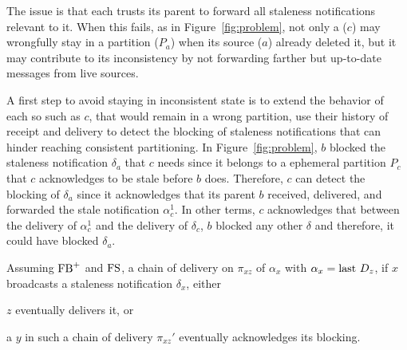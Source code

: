 The issue is that each \process trusts its parent to forward all
staleness notifications relevant to it. When this fails, as in
Figure~\ref{fig:problem}, not only a \process ($c$) may wrongfully
stay in a partition ($P_a$) when its source ($a$) already deleted it,
but it may contribute to its inconsistency by not forwarding farther
but up-to-date messages from live sources.

A first step to avoid staying in inconsistent state is to extend the
behavior of each \process so \processes such as $c$, that would remain
in a wrong partition, use their history of receipt and delivery to
detect the blocking of staleness notifications that can hinder
reaching consistent partitioning.  In Figure~\ref{fig:problem}, $b$
blocked the staleness notification $\delta_a$ that $c$ needs since it
belongs to a ephemeral partition $P_c$ that $c$ acknowledges to be
stale before $b$ does. Therefore, $c$ can detect the blocking of
$\delta_a$ since it acknowledges that its parent $b$ received,
delivered, and forwarded the stale notification $\alpha_c^1$. In other
terms, $c$ acknowledges that between the delivery of $\alpha_c^1$ and
the delivery of $\delta_c$, $b$ blocked any other $\delta$ and
therefore, it could have blocked $\delta_a$.



\begin{lemma} Assuming
  $\textup{FB}^+$ and $\textup{FS}$, a chain of delivery on $\pi_{xz}$ of
  $\alpha_x$ with $\alpha_x = \textup{last}~ D_z$, if $x$ broadcasts a staleness
  notification $\delta_x$, either
  \begin{inparaenum}[(A)]
  \item\label{lem:detectorA}  $z$ eventually delivers it, or 
  \item\label{lem:detectorB} a \process $y$ in such a chain of
    delivery $\pi_{xz}'$ eventually acknowledges its blocking.
  \end{inparaenum}
\end{lemma}


